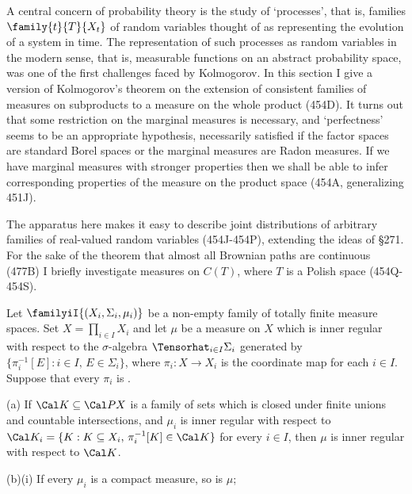 
\def\chaptername{Perfect measures, disintegrations and processes}
\def\sectionname{Measures on product spaces}


A central concern of probability theory is the study of `processes',
that is, families $\family{t}{T}{X_t}$ of random variables thought of as
representing the evolution of a system in time.   The representation of
such processes as random variables in the modern sense, that is,
measurable functions on an abstract probability space, was one of the
first challenges faced by Kolmogorov.   In this
section I give a version of Kolmogorov's theorem on the extension of
consistent families of measures on subproducts to a measure on the whole
product (454D).   It turns out that some restriction on the marginal
measures is necessary, and `perfectness' seems to be an
appropriate hypothesis, necessarily satisfied if the factor spaces are
standard Borel spaces or the marginal measures are Radon measures.   If
we have marginal measures with stronger properties then we shall be
able to infer corresponding properties of the measure on the product
space (454A, generalizing 451J).

The apparatus here makes it easy to describe joint distributions of
arbitrary families of real-valued random variables (454J-454P),
extending the ideas of \S271.
For the sake of the theorem that almost all Brownian paths are
continuous (477B)
I briefly investigate measures on $C(T)$, where $T$ is a Polish space
(454Q-454S).  %

 Let $\familyiI{(X_i,\Sigma_i,\mu_i)}$ be a
non-empty family of totally finite measure spaces.   Set
$X=\prod_{i\in I}X_i$ and let $\mu$ be a measure on $X$ which is inner
regular with
respect to the $\sigma$-algebra $\Tensorhat_{i\in I}\Sigma_i$ generated
by $\{\pi_i^{-1}[E]:i\in I,\,E\in\Sigma_i\}$, where $\pi_i:X\to X_i$ is
the coordinate map for each $i\in I$.   Suppose that every $\pi_i$ is
\imp.

(a) If $\Cal K\subseteq\Cal PX$ is a family of sets which is closed
under finite unions and countable intersections, and $\mu_i$ is inner
regular with respect to
$\Cal K_i=\{K:K\subseteq X_i,\,\pi_i^{-1}[K]\in\Cal K\}$ for every
$i\in I$, then $\mu$ is inner regular with respect to $\Cal K$.

(b)(i) If every $\mu_i$ is a compact measure, so is $\mu$;

